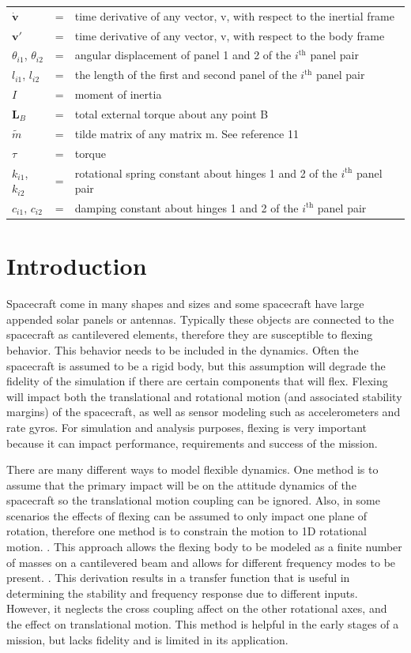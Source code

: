 \documentclass[paper]{aiaaNew}
\begin{document}
\begin{tabular}{@{}lcl@{}}
		$\dot{\bm{v}}$ &=& time derivative of any vector, v, with respect to the inertial frame \\
		$\bm{v}'$ &=& time derivative of any vector, v, with respect to the body frame \\
		$\theta_{i1}$, $\theta_{i2}$ &=& angular displacement of panel 1 and 2 of the $i^\text{th}$ panel pair \\
		$l_{i1}$, $l_{i2}$ &=& the length of the first and second panel of the $i^\text{th}$ panel pair \\
		$I$ &=& moment of inertia \\
		$\bm L_B$ &=& total external torque about any point B \\
		$\tilde{m}$ &=& tilde matrix of any matrix m. See reference 11 \\
	    $\tau$ &=& torque \\
	    $k_{i1}$, $k_{i2}$ &=& rotational spring constant about hinges 1 and 2 of the $i^\text{th}$ panel pair \\
	    $c_{i1}$, $c_{i2}$ &=& damping constant about hinges 1 and 2 of the $i^\text{th}$ panel pair \\  
		
\end{tabular} 
	
	\section{Introduction}
	Spacecraft come in many shapes and sizes and some spacecraft have large appended solar panels or antennas. Typically these objects are connected to the spacecraft as cantilevered elements, therefore they are susceptible to flexing behavior. This behavior needs to be included in the dynamics. Often the spacecraft is assumed to be a rigid body, but this assumption will degrade the fidelity of the simulation if there are certain components that will flex. Flexing will impact both the translational and rotational motion (and associated stability margins) of the spacecraft, as well as sensor modeling such as accelerometers and rate gyros. For simulation and analysis purposes, flexing is very important because it can impact performance, requirements and success of the mission.

There are many different ways to model flexible dynamics. One method is to assume that the primary impact will be on the attitude dynamics of the spacecraft so the translational motion coupling can be ignored. Also, in some scenarios the effects of flexing can be assumed to only impact one plane of rotation, therefore one method is to constrain the motion to 1D rotational motion. \cite{sidi1997spacecraft}. This approach allows the flexing body to be modeled as a finite number of masses on a cantilevered beam and allows for different frequency modes to be present. \cite{sidi1997spacecraft}. This derivation results in a transfer function that is useful in determining the stability and frequency response due to different inputs. However, it neglects the cross coupling affect on the other rotational axes, and the effect on translational motion. This method is helpful in the early stages of a mission, but lacks fidelity and is limited in its application.
\end{document}
